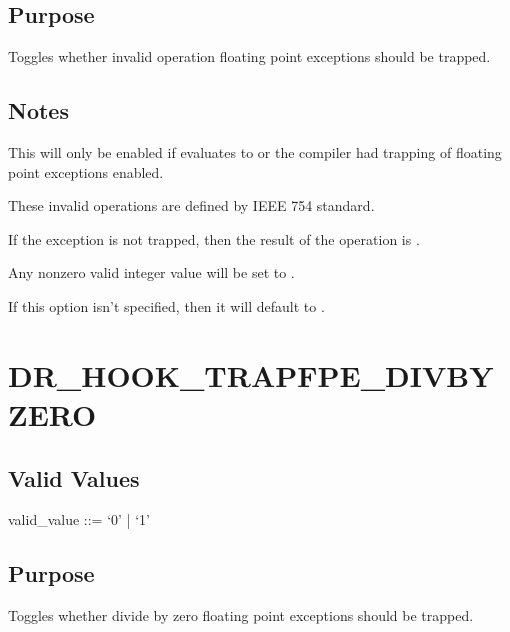 \documentclass[letterpaper,10pt,english]{sphinxmanual}
\begin{document}
\subsection{Purpose}
\label{\detokenize{flag/flag:id166}}
\sphinxAtStartPar
Toggles whether invalid operation floating point exceptions should be trapped.


\subsection{Notes}
\label{\detokenize{flag/flag:id167}}
\sphinxAtStartPar
This will only be enabled if {\hyperref[\detokenize{flag/flag:dr-hook-trapfpe}]{}} evaluates to  or the compiler had trapping of floating point exceptions enabled.

\sphinxAtStartPar
These invalid operations are defined by IEEE 754 standard.

\sphinxAtStartPar
If the exception is not trapped, then the result of the operation is .

\sphinxAtStartPar
Any non\sphinxhyphen{}zero valid integer value will be set to .

\sphinxAtStartPar
If this option isn’t specified, then it will default to .


\section{DR\_HOOK\_TRAPFPE\_DIVBYZERO}
\label{\detokenize{flag/flag:dr-hook-trapfpe-divbyzero}}\label{\detokenize{flag/flag:id169}}

\subsection{Valid Values}
\label{\detokenize{flag/flag:id170}}
\begin{DUlineblock}{0em}
\item[] valid\_value ::= ‘0’ | ‘1’
\end{DUlineblock}


\subsection{Purpose}
\label{\detokenize{flag/flag:id171}}
\sphinxAtStartPar
Toggles whether divide by zero floating point exceptions should be trapped.
\end{document}
